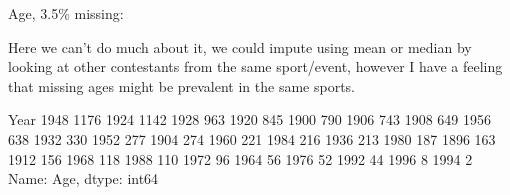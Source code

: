 \documentclass[letterpaper,10pt,english]{jupyterBook}
\begin{document}
\sphinxAtStartPar
Age, 3.5\% missing:

\sphinxAtStartPar
Here we can’t do much about it, we could impute using mean or median by looking at other contestants from the same sport/event, however I  have a feeling that missing ages might be prevalent in the same sports.

\begin{sphinxVerbatim}[commandchars=\\\{\}]
\PYG{p}{[}\PYG{p}{]}  
\end{sphinxVerbatim}

\begin{sphinxVerbatim}[commandchars=\\\{\}]
Year
1948    1176
1924    1142
1928     963
1920     845
1900     790
1906     743
1908     649
1956     638
1932     330
1952     277
1904     274
1960     221
1984     216
1936     213
1980     187
1896     163
1912     156
1968     118
1988     110
1972      96
1964      56
1976      52
1992      44
1996       8
1994       2
Name: Age, dtype: int64
\end{sphinxVerbatim}

\begin{sphinxVerbatim}[commandchars=\\\{\}]
\PYG{p}{[}\PYG{p}{]}  
\end{sphinxVerbatim}
\end{document}
